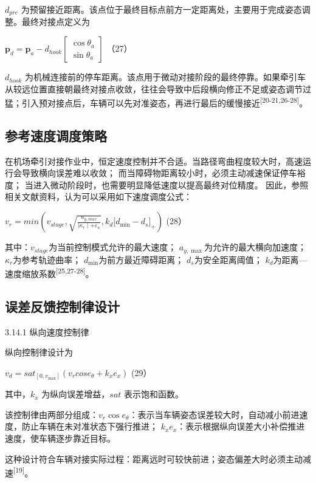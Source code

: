 \(d_{pre}\)
为预留接近距离。该点位于最终目标点前方一定距离处，主要用于完成姿态调整。最终对接点定义为

\(\mathbf{p}_{d} = \mathbf{p}_{a} - d_{hook}\left\lbrack \begin{array}{r}
\cos\theta_{a} \\
\sin\theta_{a}
\end{array} \right\rbrack\) （27）

\(d_{hook}\)
为机械连接前的停车距离。该点用于微动对接阶段的最终停靠。如果牵引车从较远位置直接朝最终对接点收敛，往往会导致中后段横向修正不足或姿态调节过猛；引入预对接点后，车辆可以先对准姿态，再进行最后的缓慢接近\textsuperscript{[20-21,26-28]}。

\subsection{参考速度调度策略}

在机场牵引对接作业中，恒定速度控制并不合适。当路径弯曲程度较大时，高速运行会导致横向误差难以收敛；
而当障碍物距离较小时，必须主动减速保证停车裕度；
当进入微动阶段时，也需要明显降低速度以提高最终对位精度。
因此，参照相关文献资料，认为可以采用如下速度调度公式：

\(v_{r} = min\left( v_{stage},\sqrt{\frac{a_{y,max}}{\mid \kappa_{r} \mid + \varepsilon_{\kappa}}},k_{d}\lbrack d_{\min} - d_{s}\rbrack_{+} \right)\)
(28）

其中：\(v_{stage}\)为当前控制模式允许的最大速度；
\(a_{y,\max}\)为允许的最大横向加速度； \(\kappa_{r}\)为参考轨迹曲率；
\(d_{\min}\)为前方最近障碍距离； \(d_{s}\)为安全距离阈值；
\(k_{d}\)为距离---速度缩放系数\textsuperscript{[25,27-28]}。

\subsection{误差反馈控制律设计}

3.14.1 纵向速度控制律

纵向控制律设计为

\(v_{d} = {sat}_{\left\lbrack 0,v_{\max} \right\rbrack}\left( v_{r}cose_{\theta} + k_{x}e_{x} \right)\)
(29）

其中，\(k_{x}\) 为纵向误差增益，\(sat\) 表示饱和函数。

该控制律由两部分组成：\(v_{r}\cos e_{\theta}\)：表示当车辆姿态误差较大时，自动减小前进速度，防止车辆在未对准状态下强行推进；
\(k_{x}e_{x}\)：表示根据纵向误差大小补偿推进速度，使车辆逐步靠近目标。

这种设计符合车辆对接实际过程：距离远时可较快前进；姿态偏差大时必须主动减速\textsuperscript{[19]}。

